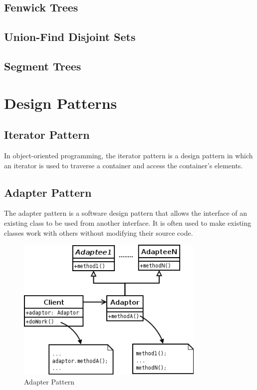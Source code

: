 \documentclass[a4paper, 12pt]{article}
\begin{document}
  \subsection{Fenwick Trees}

  \subsection{Union-Find Disjoint Sets}

  \subsection{Segment Trees}
	
\section{Design Patterns}

	\subsection{Iterator Pattern}
	
In object-oriented programming, the iterator pattern is a design pattern in which an iterator is used to traverse a container and access the container's elements.

	\subsection{Adapter Pattern}
	
The adapter pattern is a software design pattern that allows the interface of an existing class to be used from another interface. It is often used to make existing classes work with others without modifying their source code.

\begin{figure}[!h]
	\center\includegraphics[width=9cm]{figures/adapter.png}
	\caption{Adapter Pattern}
\end{figure}
\end{document}
